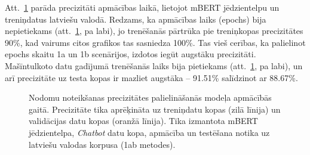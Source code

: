 Att.~\ref{fig:chatbot-bert} parāda precizitāti apmācības laikā, lietojot mBERT jēdzientelpu un treniņdatus latviešu valodā. Redzams, ka apmācības laiks (epochs) bija nepietiekams (att.~\ref{fig:chatbot-bert}, pa labi), jo trenēšanās pārtrūka pie treniņkopas precizitātes 90\%, kad vairums citos grafikos tas sasniedza 100\%. Tas vieš cerības, ka palielinot epochs skaitu 1a un 1b scenārijos, izdotos iegūt augstāku precizitāti. Mašīntulkoto datu gadījumā trenēšanās laiks bija pietiekams (att.~\ref{fig:chatbot-bert}, pa labi), un arī precizitāte uz testa kopas ir mazliet augstāka -- 91.51\% salīdzinot ar 88.67\%.



\begin{figure}[h] 
   \centering
   \caption{Nodomu noteikšanas precizitātes palielināšanās modeļa apmācībās gaitā. Precizitāte tika aprēķināta uz treniņdatu kopas (zilā līnija) un validācijas datu kopas (oranžā līnija). Tika izmantota mBERT jēdzientelpa, \textit{Chatbot} datu kopa, apmācība un testēšana notika uz latviešu valodas korpusa (1ab metodes).} 
   \label{fig:chatbot-bert}
\end{figure}


